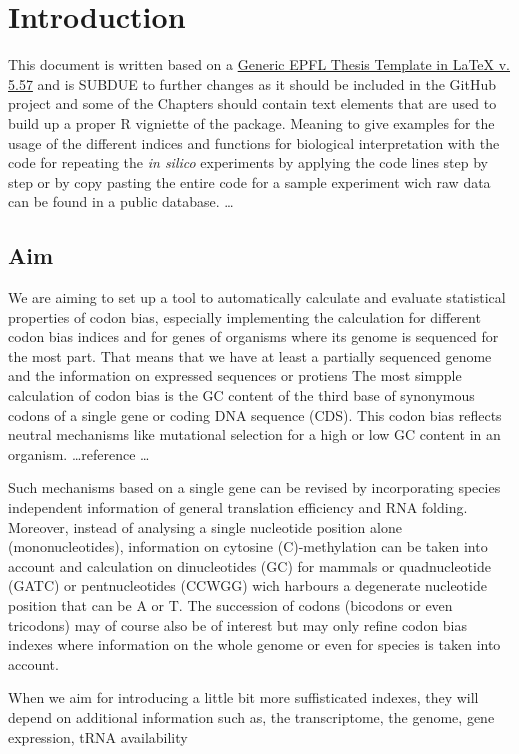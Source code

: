 \chapter*{Introduction}
This document is written based on a \href{http://phd.epfl.ch/thesistemplates}{Generic EPFL Thesis Template in LaTeX v. 5.57} and is SUBDUE to further changes as it should be included in the GitHub project and some of the Chapters should contain text elements that are used to build up a proper R vigniette of the package. Meaning to give examples for the usage of the different indices and functions for biological interpretation with the code for repeating the \textit{in silico} experiments by applying the code lines step by step or by copy pasting the entire code for a sample experiment wich raw data can be found in a public database.     \dots

\section{Aim}
We are aiming to set up a tool to automatically calculate and evaluate statistical properties of codon bias, especially implementing the calculation for different codon bias indices and for genes of organisms where its genome is sequenced for the most part. That means that we have at least a partially sequenced genome and the information on expressed sequences or protiens
The most simpple calculation of codon bias is the GC content of the third base of synonymous codons of a single gene or coding DNA sequence (CDS). This codon bias reflects neutral mechanisms like mutational selection for a high or low GC content in an organism.
\dots reference \dots

Such mechanisms based on a single gene can be revised by incorporating species independent information of general translation efficiency and RNA folding. Moreover, instead of analysing a single nucleotide position alone (mononucleotides), information on cytosine (C)-methylation can be taken into account and calculation on dinucleotides (GC) for mammals or quadnucleotide (GATC) or pentnucleotides (CCWGG) wich harbours a degenerate nucleotide position that can be A or T. The succession of codons (bicodons or even tricodons) may of course also be of interest but may only refine codon bias indexes where information on the whole genome or even for species is taken into account.

When we aim for introducing a little bit more suffisticated indexes, they will depend on additional information such as, the transcriptome, the genome, gene expression, tRNA availability

